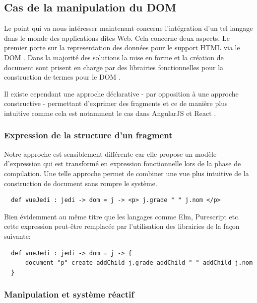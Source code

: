 \documentclass[twoside,a4paper]{article}
\begin{document}
\subsection{Cas de la manipulation du DOM}

Le point qui va nous intéresser maintenant concerne l'intégration d'un
tel langage dans  le monde des applications dites  Web.  Cela concerne
deux aspects. Le premier porte  sur la representation des données pour
le support HTML via le DOM  \cite{dom}. Dans la majorité des solutions
la mise en forme et la création de document sont prisent en charge par
des librairies fonctionnelles  pour la construction de  termes pour le
DOM \cite{dom}. 

Il existe  cependant une approche  déclarative - par opposition  à une
approche constructive -  permettant d'exprimer des fragments  et ce de
manière plus intuitive comme cela  est notamment le cas dans AngularJS
\cite{angularjs} et React \cite{react}.

\subsubsection{Expression de la structure d'un fragment}

Notre approche est sensiblement différente  car elle propose un modèle
d'expression qui est transformé en expression fonctionnelle lors de la
phase de  compilation. Une telle  approche permet de combiner  une vue
plus intuitive de la construction de document sans rompre le système.

\lstset{language=Thicket}
\begin{lstlisting}
  def vueJedi : jedi -> dom = j -> <p> j.grade " " j.nom </p> 
\end{lstlisting}

\noindent Bien  évidemment au même  titre que les langages  comme Elm,
Purescript   etc.    cette    expression   peut-être   remplacée   par
l'utilisation des librairies de la façon suivante:

\begin{lstlisting}
  def vueJedi : jedi -> dom = j -> {
      document "p" create addChild j.grade addChild " " addChild j.nom
  }
\end{lstlisting}

\subsubsection{Manipulation et système réactif}
\end{document}
